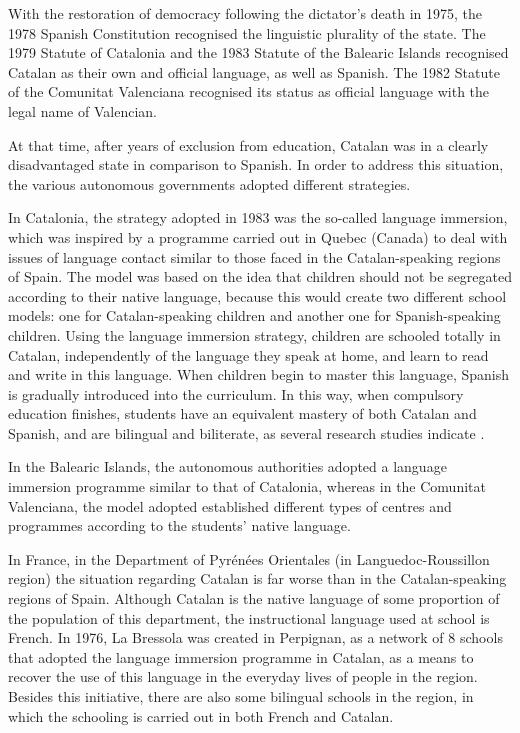 \begin{multicols}{2}
With the restoration of democracy following the dictator's death in 1975, the 1978 Spanish Constitution recognised the linguistic plurality of the state. The 1979 Statute of Catalonia and the 1983 Statute of the Balearic Islands recognised Catalan as their own and official language, as well as Spanish. The 1982 Statute of the Comunitat Valenciana recognised its status as official language with the legal name of Valencian.

At that time, after years of exclusion from education, Catalan was in a clearly disadvantaged state in comparison to Spanish. In order to address this situation, the various autonomous governments adopted different strategies.

In Catalonia, the strategy adopted in 1983 was the so-called language immersion, which was inspired by a programme carried out in Quebec (Canada) to deal with issues of language contact similar to those faced in the Catalan-speaking regions of Spain. The model was based on the idea that children should not be segregated according to their native language, because this would create two different school models: one for Catalan-speaking children and another one for Spanish-speaking children. Using the language immersion strategy, children are schooled totally in Catalan, independently of the language they speak at home, and learn to read and write in this language. When children begin to master this language, Spanish is gradually introduced into the curriculum. In this way, when compulsory education finishes, students have an equivalent mastery of both Catalan and Spanish, and are bilingual and biliterate, as several research studies indicate \cite{CAT-Nota5}.


In the Balearic Islands, the autonomous authorities adopted a language immersion programme similar to that of Catalonia, whereas in the Comunitat Valenciana, the model adopted established different types of centres and programmes according to the students' native language.

In France, in the Department of Pyrénées Orientales (in Languedoc-Roussillon region) the situation regarding Catalan is far worse than in the Catalan-speaking regions of Spain. Although Catalan is the native language of some proportion of the population of this department, the instructional language used at school is French. In 1976, La Bressola \cite{CAT-Nota6} was created in Perpignan, as a network of 8 schools that adopted the language immersion programme in Catalan, as a means to recover the use of this language in the everyday lives of people in the region. Besides this initiative, there are also some bilingual schools in the region, in which the schooling is carried out in both French and Catalan.


\end{multicols}

